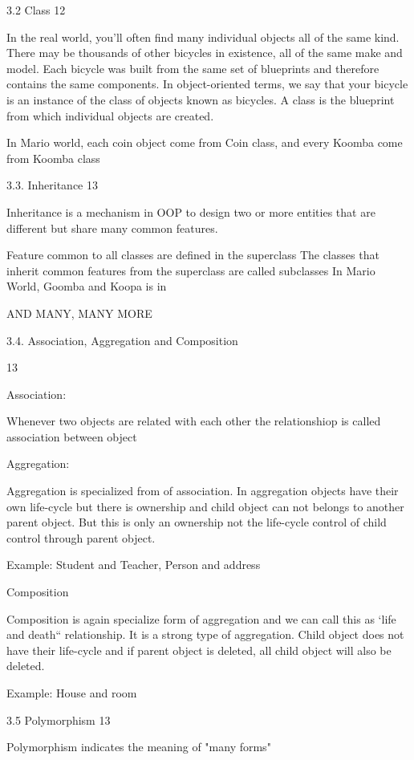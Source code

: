 3.2 Class 12

In the real world, you'll often find many individual objects all of the same kind. There may be thousands of other bicycles in existence, all of the same make and model. Each bicycle was built from the same set of blueprints and therefore contains the same components. In object-oriented terms, we say that your bicycle is an instance of the class of objects known as bicycles. A class is the blueprint from which individual objects are created.

In Mario world, each coin object come from Coin class, and every Koomba come from Koomba class



3.3. Inheritance 13

Inheritance is a mechanism in OOP to design two or more entities that are different but share many common features.

Feature common to all classes are defined in the superclass
The classes that inherit common features from the superclass are called subclasses
In Mario World, Goomba and Koopa is in

AND MANY, MANY MORE



3.4. Association, Aggregation and Composition

13



Association:

Whenever two objects are related with each other the relationshiop is called association between object

Aggregation:

Aggregation is specialized from of association. In aggregation objects have their own life-cycle but there is ownership and child object can not belongs to another parent object. But this is only an ownership not the life-cycle control of child control through parent object.

Example: Student and Teacher, Person and address

Composition

Composition is again specialize form of aggregation and we can call this as `life and death`` relationship. It is a strong type of aggregation. Child object does not have their life-cycle and if parent object is deleted, all child object will also be deleted.

Example: House and room

3.5 Polymorphism 13

Polymorphism indicates the meaning of "many forms"

